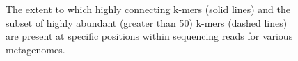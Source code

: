 \documentclass[10pt]{article}
\begin{document}
\begin{figure}
\caption{The extent to which highly connecting k-mers (solid lines) and the subset of highly abundant (greater than 50) k-mers (dashed lines) are present at specific positions within sequencing reads for various metagenomes.}
\end{figure}
\end{document}
